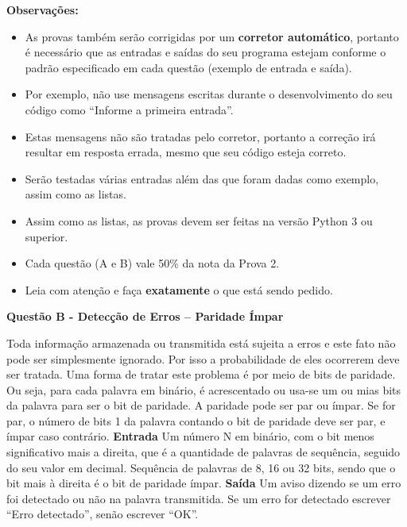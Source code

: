 \documentclass[a4paper, 12pt]{article}
\begin{document}
\textbf{{\large Observações:}}
\begin{itemize}
	\item As provas também serão corrigidas por um \textbf{corretor automático}, portanto é necessário que as entradas e saídas do seu programa estejam conforme o padrão especificado em cada questão (exemplo de entrada e saída). \item Por exemplo, não use mensagens escritas durante o desenvolvimento do seu código como “Informe a primeira entrada”.
	\item Estas mensagens não são tratadas pelo corretor, portanto a correção irá resultar em resposta errada, mesmo que seu código esteja correto.
	\item Serão testadas várias entradas além das que foram dadas como exemplo, assim como as listas.
	\item Assim como as listas, as provas devem ser feitas na versão Python 3 ou superior.
	\item Cada questão (A e B) vale 50\% da nota da Prova 2.
	\item Leia com atenção e faça \textbf{exatamente} o que está sendo pedido.
\end{itemize}
\newpage %
\begin{center}
\textbf{{\Large Questão B - Detecção de Erros – Paridade Ímpar}}
\end{center}
\vspace{5pt}
Toda informação armazenada ou transmitida está sujeita a erros e este fato não pode ser
simplesmente ignorado. Por isso a probabilidade de eles ocorrerem deve ser tratada. Uma forma
de tratar este problema é por meio de bits de paridade. Ou seja, para cada palavra em binário, é
acrescentado ou usa-se um ou mias bits da palavra para ser o bit de paridade. A paridade pode
ser par ou ímpar. Se for par, o número de bits 1 da palavra contando o bit de paridade deve ser
par, e ímpar caso contrário.
\newline \newline
\textbf{{\large Entrada}} \newline
Um número N em binário, com o bit menos significativo mais a direita, que é a quantidade de
palavras de sequência, seguido do seu valor em decimal.
\newline Sequência de palavras de 8, 16 ou 32 bits, sendo que o bit mais à direita é o bit de paridade
ímpar.
\newline \newline
\textbf{{\large Saída}} \newline
Um aviso dizendo se um erro foi detectado ou não na palavra transmitida. Se um erro for
detectado escrever “Erro detectado”, senão escrever “OK”.
\newline \newline
\end{document}
